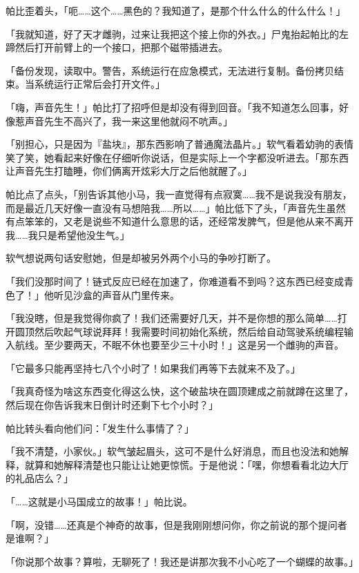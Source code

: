 帕比歪着头，「呃……这个……黑色的？我知道了，是那个什么什么的什么什么！」

「我就知道，好了天才雌驹，过来让我把这个接上你的外衣。」尸鬼抬起帕比的左蹄然后打开前臂上的一个接口，把那个磁带插进去。

「{\mtzh 备份发现，读取中。警告，系统运行在应急模式，无法进行复制。备份拷贝结束。当系统运行正常后会打开文件。}」

「嗨，声音先生！」帕比打了招呼但是却没有得到回音。「我不知道怎么回事，好像惹声音先生不高兴了，我一来这里他就闷不吭声。」

「别担心，只是因为『盐块』，那东西影响了普通魔法晶片。」软气看着幼驹的表情笑了笑，她看起来好像在仔细听你说话，但是实际上一个字都没听进去。「那东西让声音先生打瞌睡，你们俩离开炫彩大厅之后他就醒了。」

帕比点了点头，「别告诉其他小马，我一直觉得有点寂寞……我不是说我没有朋友，而是最近几天好像一直没有马想陪我……所以……」帕比低下了头，「声音先生虽然有点笨笨的，又老是说些不知道什么意思的话，还经常发脾气，但是他从来不离开我……我只是希望他没生气。」

软气想说两句话安慰她，但是却被另外两个小马的争吵打断了。

「我们没那时间了！链式反应已经在加速了，你难道看不到吗？这东西已经变成青色了！」他听见沙盒的声音从门里传来。

「我没瞎，但是我觉得你疯了！我们还需要好几天，并不是你想的那么简单……打开圆顶然后吹起气球说拜拜！我需要时间初始化系统，然后给自动驾驶系统编程输入航线。至少要两天，不眠不休也要至少三十小时！」这是另一个雌驹的声音。

「它最多只能再坚持七八个小时了！如果我们再等下去就来不及了。」

「我真奇怪为啥这东西变化得这么快，这个破盐块在圆顶建成之前就蹲在这里了，然后现在你告诉我末日倒计时还剩下七个小时？」

帕比转头看向他们问：「发生什么事情了？」

「我不清楚，小家伙。」软气皱起眉头，这可不是什么好消息，而且也没法和她解释，就算和她解释清楚也只能让让她更惊慌。于是他说：「嘿，你想看看北边大厅的礼品店么？」

\horizonline


「……这就是小马国成立的故事！」帕比说。

「啊，没错……还真是个神奇的故事，但是我刚刚想问你，你之前说的那个提问者是谁啊？」

「你说那个故事？算啦，无聊死了！我还是讲那次我不小心吃了一个蝴蝶的故事。」

